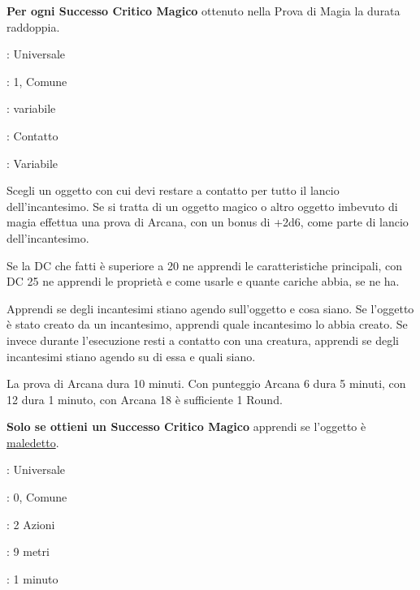 \begin{multicols}{2}
\textbf{Per ogni Successo Critico Magico} ottenuto nella Prova di Magia la durata raddoppia.

\noindent\colorbox{OBSSgold!10}{
\begin{minipage}{0.95\linewidth}
\begin{description}[noitemsep, topsep=0pt, parsep=0pt, partopsep=0pt, leftmargin=0cm, labelwidth=1.3cm]
	\item[\textbf{Lista}]: Universale
	\item[\textbf{Livello}]: 1, Comune
	\item[\textbf{Lancio}]: variabile
	\item[\textbf{Gittata}]: Contatto
	\item[\textbf{Durata}]: Variabile
\end{description}
\end{minipage}}\smallskip

Scegli un oggetto con cui devi restare a contatto per tutto il lancio dell'incantesimo. Se si tratta di un oggetto magico o altro oggetto imbevuto di magia effettua una prova di Arcana, con un bonus di +2d6, come parte di lancio dell'incantesimo.

Se la DC che fatti è superiore a 20 ne apprendi le caratteristiche principali, con DC 25 ne apprendi le proprietà e come usarle e quante cariche abbia, se ne ha.

Apprendi se degli incantesimi stiano agendo sull'oggetto e cosa siano. Se l'oggetto è stato creato da un incantesimo, apprendi quale incantesimo lo abbia creato. Se invece durante l'esecuzione resti a contatto con una creatura, apprendi se degli incantesimi stiano agendo su di essa e quali siano.

La prova di Arcana dura 10 minuti. Con punteggio Arcana 6 dura 5 minuti, con 12 dura 1 minuto, con Arcana 18 è sufficiente 1 Round.

\textbf{Solo se ottieni un Successo Critico Magico} apprendi se l'oggetto è \hyperlink{oggettimaledettiid}{maledetto}.

\noindent\colorbox{OBSSgold!10}{
\begin{minipage}{0.95\linewidth}
\begin{description}[noitemsep, topsep=0pt, parsep=0pt, partopsep=0pt, leftmargin=0cm, labelwidth=1.3cm]
	\item[\textbf{Lista}]: Universale
	\item[\textbf{Livello}]: 0, Comune
	\item[\textbf{Lancio}]: 2 Azioni
	\item[\textbf{Gittata}]: 9 metri
	\item[\textbf{Durata}]: 1 minuto
\end{description}
\end{minipage}}\smallskip


\end{multicols}
